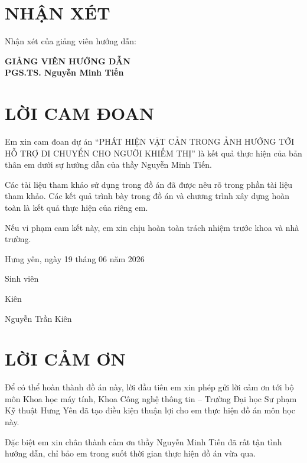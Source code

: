 \documentclass[12pt,a4paper,oneside]{report}
\begin{document}
\chapter*{NHẬN XÉT}
\noindent Nhận xét của giảng viên hướng dẫn:\par
\newcommand{\reviewline}{\noindent\makebox[\textwidth]{\dotfill}\par\vspace{0.35cm}}
\reviewline\reviewline\reviewline\reviewline\reviewline
\reviewline\reviewline\reviewline\reviewline\reviewline
\reviewline\reviewline\reviewline\reviewline\reviewline
\begin{flushright}\textbf{GIẢNG VIÊN HƯỚNG DẪN}\\[1.8cm]
\textbf{PGS.TS. Nguyễn Minh Tiến}\end{flushright}

\chapter*{LỜI CAM ĐOAN}
Em xin cam đoan dự án “PHÁT HIỆN VẬT CẢN TRONG ẢNH HƯỚNG TỚI HỖ TRỢ DI CHUYỂN CHO NGƯỜI KHIẾM THỊ” là kết quả thực hiện của bản thân em dưới sự hướng dẫn của thầy Nguyễn Minh Tiến.

Các tài liệu tham khảo sử dụng trong đồ án đã được nêu rõ trong phần tài liệu tham khảo. Các kết quả trình bày trong đồ án và chương trình xây dựng hoàn toàn là kết quả thực hiện của riêng em.

Nếu vi phạm cam kết này, em xin chịu hoàn toàn trách nhiệm trước khoa và nhà trường.

Hưng yên, ngày 19 tháng 06 năm 2026

Sinh viên

Kiên

Nguyễn Trần Kiên

\chapter*{LỜI CẢM ƠN}
Để có thể hoàn thành đồ án này, lời đầu tiên em xin phép gửi lời cảm ơn tới bộ môn Khoa học máy tính, Khoa Công nghệ thông tin – Trường Đại học Sư phạm Kỹ thuật Hưng Yên đã tạo điều kiện thuận lợi cho em thực hiện đồ án môn học này.

Đặc biệt em xin chân thành cảm ơn thầy Nguyễn Minh Tiến đã rất tận tình hướng dẫn, chỉ bảo em trong suốt thời gian thực hiện đồ án vừa qua.
\end{document}
